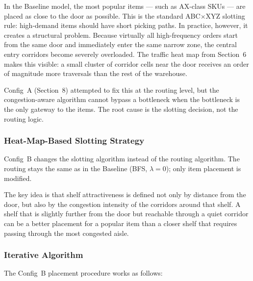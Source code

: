 \documentclass[12pt,a4paper]{article}
\begin{document}
In the Baseline model, the most popular items --- such as AX-class SKUs --- are
placed as close to the door as possible. This is the standard ABC$\times$XYZ
slotting rule: high-demand items should have short picking paths. In practice,
however, it creates a structural problem. Because virtually all high-frequency
orders start from the same door and immediately enter the same narrow zone,
the central entry corridors become severely overloaded. The traffic heat map
from Section~6 makes this visible: a small cluster of corridor cells near the door
receives an order of magnitude more traversals than the rest of the warehouse.

Config~A (Section~8) attempted to fix this at the routing level, but the
congestion-aware algorithm cannot bypass a bottleneck when the bottleneck is
the only gateway to the items. The root cause is the slotting decision, not the
routing logic.

\subsubsection{Heat-Map-Based Slotting Strategy}

Config~B changes the slotting algorithm instead of the routing algorithm. The
routing stays the same as in the Baseline (BFS, $\lambda = 0$); only item
placement is modified.

The key idea is that shelf attractiveness is defined not only by distance from
the door, but also by the congestion intensity of the corridors around that
shelf. A shelf that is slightly further from the door but reachable through a
quiet corridor can be a better placement for a popular item than a closer shelf
that requires passing through the most congested aisle.

\subsubsection{Iterative Algorithm}

The Config~B placement procedure works as follows:
\end{document}
